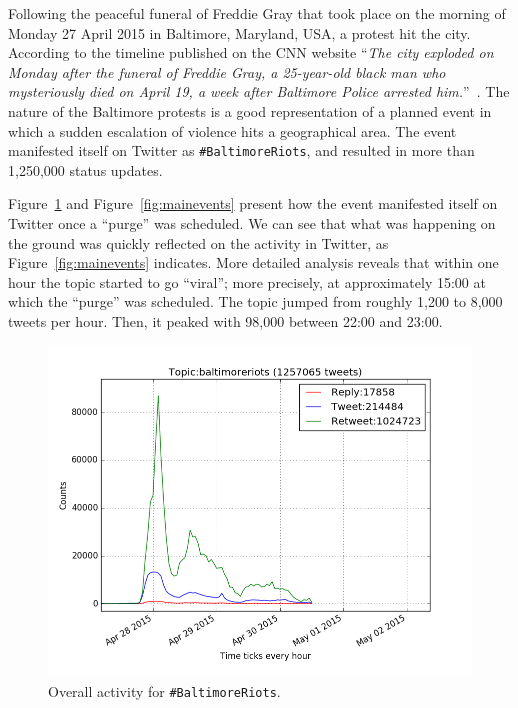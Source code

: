 \documentclass[conference]{IEEEtran}
\begin{document}
Following the peaceful funeral of Freddie Gray that took place on the
morning of Monday 27 April 2015 in Baltimore, Maryland, USA, a protest
hit the city. According to the timeline published on the CNN website
``{\emph{The city exploded on Monday after the funeral of Freddie
Gray, a 25-year-old black man who mysteriously died on April 19, a
week after Baltimore Police arrested
him.}}''~\cite{baltimorewiki:2015}. The nature of the Baltimore protests
is a good representation of a planned event in which a sudden
escalation of violence hits a geographical area. The event manifested
itself on Twitter as {\texttt{\#BaltimoreRiots}}, and resulted in more
than 1,250,000 status updates.

Figure~\ref{fig:overallactivity} and Figure~\ref{fig:mainevents}
present how the event manifested itself on Twitter once a ``purge'' was
scheduled. We can see that what was happening on the ground was
quickly reflected on the activity in Twitter, as
Figure~\ref{fig:mainevents} indicates. More detailed analysis reveals
that within one hour the topic started to go ``viral''; more
precisely, at approximately 15:00 at which the ``purge'' was
scheduled. The topic jumped from roughly 1,200 to 8,000 tweets per
hour. Then, it peaked with 98,000 between 22:00 and 23:00.

\begin{figure}[!htb]
\centering
\includegraphics[width=\columnwidth]{images/overallactivity.png}
\caption{Overall activity for {\texttt{\#BaltimoreRiots}}.}
\label{fig:overallactivity}
\end{figure}
\end{document}
